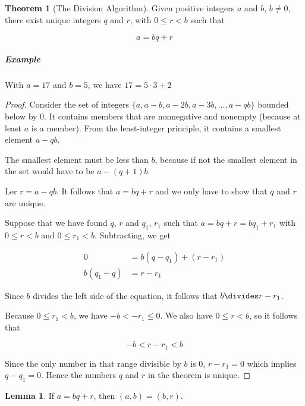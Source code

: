\documentclass{article}
\theoremstyle{definition} %
\newtheorem{theorem}{Theorem}[section] %
\theoremstyle{definition}
\theoremstyle{definition}
\newtheorem{lemma}{Lemma}[section]
\theoremstyle{definition}
\begin{document}
  \begin{theorem}[The Division Algorithm]
    Given positive integers $a$ and $b$, $b \neq 0$, there exist unique integers $q$ and $r$, with $0 \leq r < b$ such that
    
    \begin{equation*}
      a = bq + r
    \end{equation*}
  \end{theorem}
  
  \subparagraph{Example} With $a = 17$ and $b = 5$, we have $17 = 5 \cdot 3 + 2$
  
  \begin{proof}
    Consider the set of integers $\{a, a - b, a - 2b, a - 3b, \dots, a - qb\}$ bounded below by 0.
    It contains members that are nonnegative and nonempty (because at least $a$ is a member).
    From the least-integer principle, it contains a smallest element $a - qb$.
    
    The smallest element must be less than $b$, because if not the smallest element in the set would have
    to be $a - (q + 1)b$.
    
    Ler $r = a - qb$. It follows that $a = bq + r$ and we only have to show that $q$ and $r$ are unique.
    
    Suppose that we have found $q$, $r$ and $q_1$, $r_1$ such that $a = bq + r = bq_1 + r_1$ with
    $0 \leq r < b$ and $0 \leq r_1 < b$. Subtracting, we get
    
    \begin{align*}
      0 &= b(q - q_1) + (r - r_1) \\
      b(q_1 - q) &= r - r_1
    \end{align*}
    
    Since $b$ divides the left side of the equation, it follows that $b \divides r - r_1$.
    
    Because $0 \leq r_1 < b$, we have $-b < -r_1 \leq 0$. We also have $0 \leq r < b$, so it follows that
    
    \begin{equation*}
      -b < r - r_1 < b
    \end{equation*}
    
    Since the only number in that range divisible by $b$ is 0, $r - r_1 = 0$ which implies $q - q_1 = 0$.
    Hence the numbers $q$ and $r$ in the theorem is unique.
  \end{proof}
  
  \begin{lemma}
    If $a = bq + r$, then $(a, b) = (b, r)$.
  \end{lemma}
  
\end{document}

